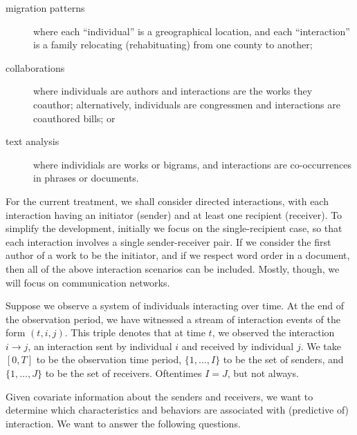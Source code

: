 \documentclass[aoas,preprint]{imsart}
\begin{document}
\begin{description}
	\item[migration patterns] where each ``individual'' is a greographical location, and each ``interaction'' is a family relocating (rehabituating) from one county to another;
	
	\item[collaborations] where individuals are authors and interactions are the works they coauthor; alternatively, individuals are congressmen and interactions are coauthored bills; or

	\item[text analysis] where individials are works or bigrams, and interactions are co-occurrences in phrases or documents.
\end{description}

For the current treatment, we shall consider directed interactions, with each interaction having an initiator (sender) and at least one recipient (receiver).  To simplify the development, initially we focus on the single-recipient case, so that each interaction involves a single sender-receiver pair.  If we consider the first author of a work to be the initiator, and if we respect word order in a document, then all of the above interaction scenarios can be included.  Mostly, though, we will focus on communication networks.

Suppose we observe a system of individuals interacting over time.  At the end of the observation period, we have witnessed a stream of interaction events of the form $(t, i, j)$.  This triple denotes that at time $t$, we observed the interaction $i \to j$, an interaction sent by individual $i$ and received by individual $j$.  We take $[0,T]$ to be the observation time period, $\{1, \ldots, I \}$ to be the set of senders, and $\{1, \ldots, J \}$ to be the set of receivers.  Oftentimes $I = J$, but not always.

Given covariate information about the senders and receivers, we want to determine which characteristics and behaviors are associated with (predictive of) interaction.  We want to answer the following questions.
\end{document}
